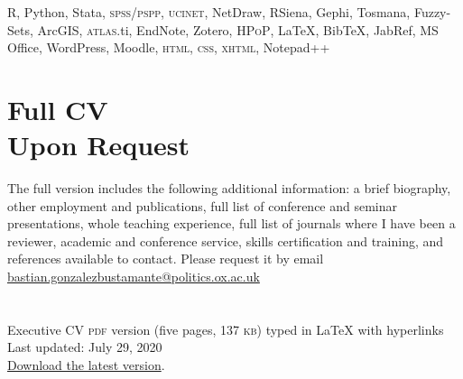 \documentclass[letterpaper,margin]{res}
\begin{document}
\begin{resume}
{\small R, Python, Stata, {\scshape spss/pspp}, {\scshape ucinet}, NetDraw, RSiena, Gephi, Tosmana, Fuzzy-Sets, ArcGIS, {\scshape atlas}.ti, EndNote, Zotero, {\scshape HPoP}, {\LaTeX}, Bib{\TeX}, JabRef, MS Office, WordPress, Moodle, {\scshape html}, {\scshape css}, {\scshape xhtml}, Notepad{\footnotesize ++}}


\section{\footnotesize Full CV \\ Upon Request}

{\small The full version includes the following additional information: a brief biography, other employment and publications, full list of conference and seminar presentations, whole teaching experience, full list of journals where I have been a reviewer, academic and conference service, skills certification and training, and references available to contact. Please request it by email {\large \Letter} \href{mailto:bastian.gonzalezbustamante@politics.ox.ac.uk}{bastian.gonzalezbustamante@politics.ox.ac.uk}}\\

\section{}
{\footnotesize Executive CV {\scshape pdf} version (five pages, 137 {\scshape kb}) typed in {\small {\LaTeX}} with hyperlinks}\\
{\footnotesize Last updated: July 29, 2020}\\
{\footnotesize {\normalsize \faGithub} \href{https://bgonzalezbustamante.github.io/CV-LaTeX/}{Download the latest version}.}

\end{resume} 
\end{document}
